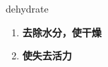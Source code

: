 
\begin{frame}
{\huge dehydrate}
\begin{center}
\begin{enumerate}\Large
  \item \textbf{去除水分，使干燥}
  \item \textbf{使失去活力}
\end{enumerate}
\end{center}
\end{frame}
